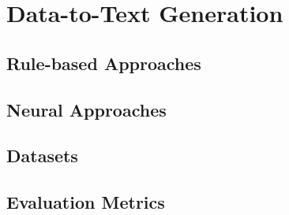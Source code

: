 \section{Data-to-Text Generation}
\label{sec:d2t}
\subsection{Rule-based Approaches}
\label{sec:rule-d2t}
\subsection{Neural Approaches}
\label{sec:neural-d2t}
\subsection{Datasets}
\label{sec:datasets}
\subsection{Evaluation Metrics}
\label{sec:evaluation}